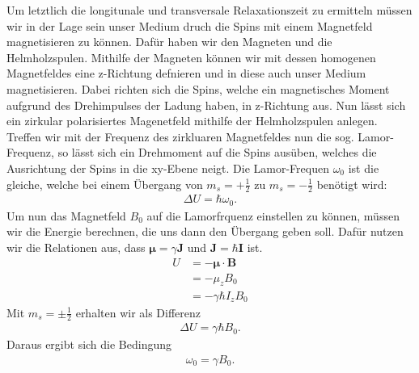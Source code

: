 \documentclass[10pt]{article}
\begin{document}
\begin{multicols}{2}
  Um letztlich die longitunale und transversale Relaxationszeit zu ermitteln müssen wir in der Lage sein unser Medium druch die Spins mit einem Magnetfeld magnetisieren zu können. Dafür haben wir den Magneten und die Helmholzspulen. Mithilfe der Magneten können wir mit dessen homogenen Magnetfeldes eine z-Richtung defnieren und in diese auch unser Medium magnetisieren. Dabei richten sich die Spins, welche ein magnetisches Moment aufgrund des Drehimpulses der Ladung haben, in z-Richtung aus. Nun lässt sich ein zirkular polarisiertes Magenetfeld mithilfe der Helmholzspulen anlegen. Treffen wir mit der Frequenz des zirkluaren Magnetfeldes nun die sog. Lamor-Frequenz, so lässt sich ein Drehmoment auf die Spins ausüben, welches die Ausrichtung der Spins in die xy-Ebene neigt. Die Lamor-Frequen $\omega_0$ ist die gleiche, welche bei einem Übergang von $m_s=+\frac{1}{2}$ zu $m_s=-\frac{1}{2}$ benötigt wird:
\begin{align}
  \Delta U = \hbar \omega_0.
\end{align}
Um nun das Magnetfeld $B_0$ auf die Lamorfrquenz einstellen zu können, müssen wir die Energie berechnen, die uns dann den Übergang geben soll. Dafür nutzen wir die Relationen aus, dass $\bm{\mu}=\gamma \bm{J}$ und $\bm{J}=\hbar\bm{I}$ ist.
\begin{align}
  U &= - \bm{\mu} \cdot \bm{B}\\
    &= - \mu_zB_0\\
    &= - \gamma\hbar I_z B_0
\end{align}
Mit $m_s=\pm \frac{1}{2}$ erhalten wir als Differenz 
\begin{align}
  \Delta U = \gamma \hbar B_0.
\end{align}
Daraus ergibt sich die Bedingung
\begin{align}
  \omega_0 = \gamma B_0.
\end{align}

\end{multicols}
\end{document}
